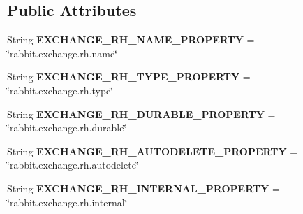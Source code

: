 \subsection*{Public Attributes}
\begin{DoxyCompactItemize}
\item 
\mbox{\label{interfaceeu_1_1h2020_1_1symbiote_1_1util_1_1RabbitConstants_a5dddb1e46066d32dabca1e047878aaeb}} 
String {\bfseries E\+X\+C\+H\+A\+N\+G\+E\+\_\+\+R\+H\+\_\+\+N\+A\+M\+E\+\_\+\+P\+R\+O\+P\+E\+R\+TY} = \char`\"{}rabbit.\+exchange.\+rh.\+name\char`\"{}
\item 
\mbox{\label{interfaceeu_1_1h2020_1_1symbiote_1_1util_1_1RabbitConstants_a35c3e47571ff8332a89c6159a56f719f}} 
String {\bfseries E\+X\+C\+H\+A\+N\+G\+E\+\_\+\+R\+H\+\_\+\+T\+Y\+P\+E\+\_\+\+P\+R\+O\+P\+E\+R\+TY} = \char`\"{}rabbit.\+exchange.\+rh.\+type\char`\"{}
\item 
\mbox{\label{interfaceeu_1_1h2020_1_1symbiote_1_1util_1_1RabbitConstants_a3284e698cc4693b48a97dfaa07d6a045}} 
String {\bfseries E\+X\+C\+H\+A\+N\+G\+E\+\_\+\+R\+H\+\_\+\+D\+U\+R\+A\+B\+L\+E\+\_\+\+P\+R\+O\+P\+E\+R\+TY} = \char`\"{}rabbit.\+exchange.\+rh.\+durable\char`\"{}
\item 
\mbox{\label{interfaceeu_1_1h2020_1_1symbiote_1_1util_1_1RabbitConstants_a66cf97c7e5417fd1732eb8bf6030c208}} 
String {\bfseries E\+X\+C\+H\+A\+N\+G\+E\+\_\+\+R\+H\+\_\+\+A\+U\+T\+O\+D\+E\+L\+E\+T\+E\+\_\+\+P\+R\+O\+P\+E\+R\+TY} = \char`\"{}rabbit.\+exchange.\+rh.\+autodelete\char`\"{}
\item 
\mbox{\label{interfaceeu_1_1h2020_1_1symbiote_1_1util_1_1RabbitConstants_a2efbde44aad88b9c6b809fb64383f369}} 
String {\bfseries E\+X\+C\+H\+A\+N\+G\+E\+\_\+\+R\+H\+\_\+\+I\+N\+T\+E\+R\+N\+A\+L\+\_\+\+P\+R\+O\+P\+E\+R\+TY} = \char`\"{}rabbit.\+exchange.\+rh.\+internal\char`\"{}
\item 
\mbox{\label{interfaceeu_1_1h2020_1_1symbiote_1_1util_1_1RabbitConstants_a371168e8cd34c550bf0bd71fd9903425}} 

\end{DoxyCompactItemize}
